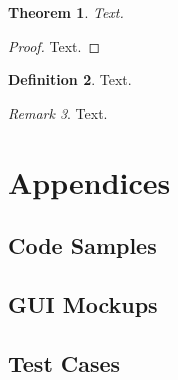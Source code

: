 \documentclass{thesis-ekf}
\newtheorem{theorem}{Theorem}[chapter]
\theoremstyle{definition}
\newtheorem{definition}[theorem]{Definition}
\theoremstyle{remark}
\newtheorem{remark}[theorem]{Remark}
\begin{document}
\begin{theorem}
Text.
\end{theorem}

\begin{proof}
Text.
\end{proof}

\begin{definition}
Text.
\end{definition}

\begin{remark}
Text.
\end{remark}


\chapter{Appendices}

\section{Code Samples}
\section{GUI Mockups}
\section{Test Cases}
\end{document}
